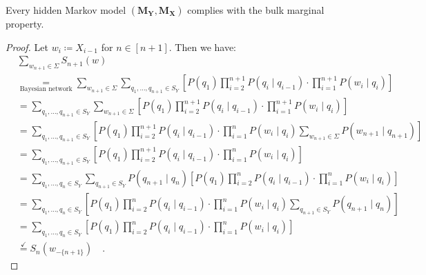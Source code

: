 \documentclass[../../main.tex]{subfiles}
\begin{document}

    \begin{lemma}
        Every hidden Markov model $(\bm{M_Y}, \bm{M_X})$ complies with the bulk marginal property.
    \end{lemma}
    \vspace{-2.5em}
    \begin{proof}
        Let $w_i \coloneqq X_{i - 1}$ for $n \in [n + 1]$. Then we have:
        \begin{align*}
            &\sum_{w_{n + 1} \in \Sigma} S_{n + 1}(w) \\
            &\underset{\text{Bayesian network}}{=} \sum_{w_{n + 1} \in \Sigma} \sum_{q_1, \dots, q_{n+1} \in S_Y} \left[ P(q_1) \prod_{i=2}^{n+1} P(q_i \mid q_{i-1}) \cdot \prod_{i=1}^{n+1} P(w_i \mid q_i) \right] \\
            &= \sum_{q_1, \dots, q_{n+1} \in S_Y} \sum_{w_{n + 1} \in \Sigma}  \left[ P(q_1) \prod_{i=2}^{n+1} P(q_i \mid q_{i-1}) \cdot \prod_{i=1}^{n+1} P(w_i \mid q_i) \right] \\
            &= \sum_{q_1, \dots, q_{n+1} \in S_Y} \left[ P(q_1) \prod_{i=2}^{n+1} P(q_i \mid q_{i-1}) \cdot \prod_{i=1}^{n} P(w_i \mid q_i) \sum_{w_{n + 1} \in \Sigma}  P(w_{n+1} \mid q_{n+1}) \right] \\
            &= \sum_{q_1, \dots, q_{n+1} \in S_Y} \left[ P(q_1) \prod_{i=2}^{n+1} P(q_i \mid q_{i-1}) \cdot \prod_{i=1}^{n} P(w_i \mid q_i) \right] \\
            &= \sum_{q_1, \dots, q_{n} \in S_Y} \sum_{q_{n+1} \in S_Y} P(q_{n+1} \mid q_n) \left[ P(q_1) \prod_{i=2}^{n} P(q_i \mid q_{i-1}) \cdot \prod_{i=1}^{n} P(w_i \mid q_i) \right] \\
            &= \sum_{q_1, \dots, q_{n} \in S_Y} \left[ P(q_1) \prod_{i=2}^{n} P(q_i \mid q_{i-1}) \cdot \prod_{i=1}^{n} P(w_i \mid q_i) \sum_{q_{n+1} \in S_Y} P(q_{n+1} \mid q_n) \right] \\
            &= \sum_{q_1, \dots, q_{n} \in S_Y} \left[ P(q_1) \prod_{i=2}^{n} P(q_i \mid q_{i-1}) \cdot \prod_{i=1}^{n} P(w_i \mid q_i) \right] \\
            &\overset{\checkmark}{=} S_n(w_{-\{n+1\}}) \quad .
        \end{align*}
    \end{proof}
\end{document}
